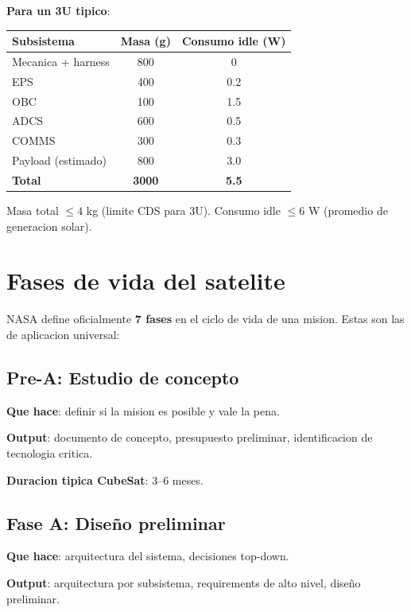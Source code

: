 \documentclass[11pt,a4paper,oneside,openright]{book}
\begin{document}
\textbf{Para un 3U tipico}:

\begin{center}
\begin{tabular}{lcc}
\toprule
\textbf{Subsistema} & \textbf{Masa (g)} & \textbf{Consumo idle (W)} \\
\midrule
Mecanica + harness   & 800  & 0 \\
EPS                  & 400  & 0.2 \\
OBC                  & 100  & 1.5 \\
ADCS                 & 600  & 0.5 \\
COMMS                & 300  & 0.3 \\
Payload (estimado)   & 800  & 3.0 \\
\midrule
\textbf{Total}       & \textbf{3000} & \textbf{5.5} \\
\bottomrule
\end{tabular}
\end{center}

Masa total $\leq 4$ kg (limite CDS para 3U). Consumo idle $\leq 6$ W
(promedio de generacion solar).

\chapter{Fases de vida del satelite}
\label{ch:fases}

NASA define oficialmente \textbf{7 fases} en el ciclo de vida de una
mision. Estas son las de aplicacion universal:

\section{Pre-A: Estudio de concepto}

\textbf{Que hace}: definir si la mision es posible y vale la pena.

\textbf{Output}: documento de concepto, presupuesto preliminar,
identificacion de tecnologia critica.

\textbf{Duracion tipica CubeSat}: 3--6 meses.

\section{Fase A: Diseño preliminar}

\textbf{Que hace}: arquitectura del sistema, decisiones top-down.

\textbf{Output}: arquitectura por subsistema, requirements de alto nivel,
diseño preliminar.
\end{document}
